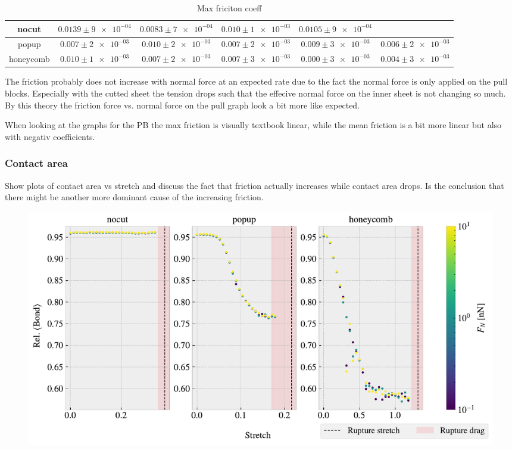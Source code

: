 \begin{table}[H]
  \begin{center}
  \caption{Max friciton coeff}
  \label{tab:fric_coeff}
  \begin{tabular}{| c | c | c | c | c | c |} \hline
    nocut & $0.0139 \pm \num{9e-04}$& $0.0083 \pm \num{7e-04}$& $0.010 \pm \num{1e-03}$& $0.0105 \pm \num{9e-04}$ &  \\ \hline
    popup & $0.007 \pm \num{2e-03}$& $0.010 \pm \num{2e-03}$& $0.007 \pm \num{2e-03}$& $0.009 \pm \num{3e-03}$& $0.006 \pm \num{2e-03}$ \\ \hline
    honeycomb & $0.010 \pm \num{1e-03}$& $0.007 \pm \num{2e-03}$& $0.007 \pm \num{3e-03}$& $0.000 \pm \num{3e-03}$& $0.004 \pm \num{3e-03}$ \\ \hline
  \end{tabular}
  \end{center}
\end{table}


The friction probably does not increase with normal force at an expected rate due to the fact the normal force is only applied on the pull blocks. Especially with the cutted sheet the tension drops such that the effecive normal force on the inner sheet is not changing so much. By this theory the friction force vs. normal force on the pull graph look a bit more like expected.

When looking at the graphs for the PB the max friction is visually textbook linear, while the mean friction is a bit more linear but also with negativ coefficients.

\subsubsection{Contact area}

Show plots of contact area vs stretch and discuss the fact that friction actually increases while contact area drops. Is the conclusion that there might be another more dominant cause of the increasing friction. 

\begin{figure}[H]
  \centering
  \includegraphics[width=\linewidth]{figures/baseline/multi_stretch_area_compare.pdf}
  \caption{}
  \label{fig:}
\end{figure}


